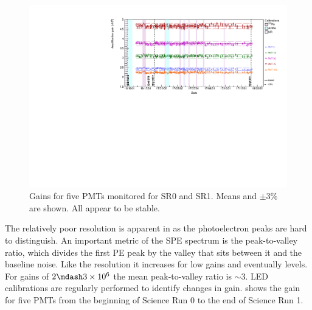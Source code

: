 \begin{figure}
\centering
\includegraphics[width=\textwidth]{PMTGainStability}
\caption{Gains for five PMTs monitored for SR0 and SR1.  Means and $\pm 3\%$ are shown.  All appear to be stable.}
\label{fig:xenon1t_pmt_time}
\end{figure}

The relatively poor resolution is apparent in  as the photoelectron peaks are hard to distinguish.  An
important metric of the SPE spectrum is the peak-to-valley ratio, which divides the first PE peak by the valley that sits between it and
the baseline noise.  Like the resolution it increases for low gains and eventually levels.  For gains of $2 \mdash 3 \times 10^{6}$ the
mean peak-to-valley ratio is ${\sim} 3$.  LED calibrations are regularly performed to identify changes in
gain.   shows the gain for five PMTs from the beginning of Science Run 0 to the end of Science Run 1.



